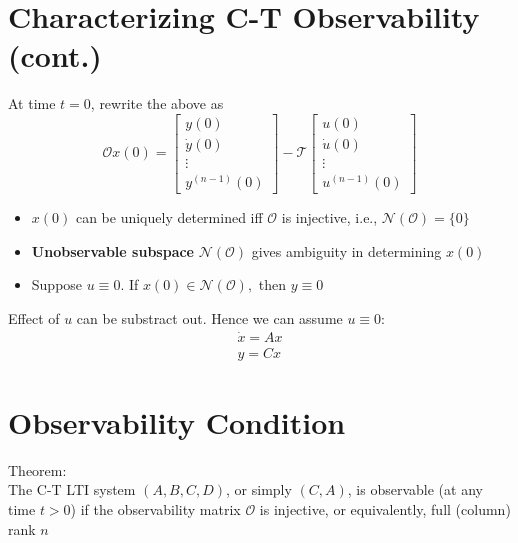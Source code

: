 \documentclass[10pt,a4paper,oneside]{article}
\begin{document}
\section{Characterizing C-T Observability (cont.)}
At time $t=0$, rewrite the above as
\[
\mathcal{O} x(0)=\left[\begin{array}{c}{y(0)} \\ {\dot{y}(0)} \\ {\vdots} \\ {y^{(n-1)}(0)}\end{array}\right]-\mathcal{T}\left[\begin{array}{c}{u(0)} \\ {\dot{u}(0)} \\ {\vdots} \\ {u^{(n-1)}(0)}\end{array}\right]
\]
\begin{itemize}
\item $x(0)$ can be uniquely determined iff $\mathcal{O}$ is injective, i.e., $\mathcal{N}(\mathcal{O})=\{0\}$
\item {\bfseries Unobservable subspace} $\mathcal{N}(\mathcal{O})$ gives ambiguity in determining $x(0)$
\item Suppose $u\equiv0$. If $x(0) \in \mathcal{N}(\mathcal{O}),$ then $y \equiv 0$
\end{itemize}
Effect of $u$ can be substract out. Hence we can assume $u\equiv0$:
\[
\begin{array}{l}{\dot{x}=A x} \\ {y=C x}\end{array}
\]
\section{Observability Condition}
Theorem:\\
The C-T LTI system $(A,B,C,D)$, or simply $(C,A)$, is observable (at any time $t>0$) if the observability matrix $\mathcal{O}$ is injective, or equivalently, full (column) rank $n$
\end{document}
